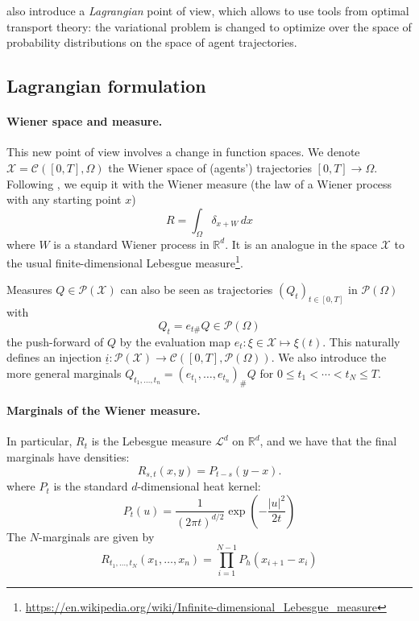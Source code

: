 \documentclass[11pt]{article}
\newcommand{\RR}{\mathbb{R}}
\newcommand{\calC}{\mathcal{C}}
\newcommand{\calP}{\mathcal{P}}
\newcommand{\calX}{\mathcal{X}}
\numberwithin{equation}{section}
\theoremstyle{definition}
\begin{document}
\textcite{benamou:hal-01295299,benamou2018entropy} also introduce a \textit{Lagrangian} point of view, which allows to use tools from optimal transport theory: the variational problem is changed to optimize over the space of probability distributions on the space of agent trajectories.


\subsection{Lagrangian formulation}

\paragraph{Wiener space and measure.} 
This new point of view involves a change in function spaces. We denote $\calX = \calC([0,T], \Omega)$ the Wiener space of (agents') trajectories $[0,T] \rightarrow\Omega$. Following \cites{benamou:hal-01295299,benamou2015lagrangian}, we equip it with the Wiener measure (the law of a Wiener process with any starting point $x$)
\[
   	R = \int_\Omega \delta_{x + W}\,dx
\]
where $W$ is a standard Wiener process in $\RR^d$. It is an analogue in the space $\calX$ to the usual finite-dimensional Lebesgue measure\footnote{\url{https://en.wikipedia.org/wiki/Infinite-dimensional_Lebesgue_measure}}.
  	
Measures $Q \in \calP(\calX)$ can also be seen as trajectories $(Q_t)_{t\in[0,T]}$ in $\calP(\Omega)$ with
\[
   	Q_t = e_{t\#}Q \in \calP(\Omega)
\]
the push-forward of $Q$ by the evaluation map $e_t\colon \xi\in\calX\longmapsto \xi(t)$. This naturally defines an injection $\underline{i} \colon \calP(\calX) \rightarrow \calC([0,T], \calP(\Omega))$. We also introduce the more general marginals $Q_{t_1,\ldots,t_n} = (e_{t_1},\ldots, e_{t_n})_\# Q$ for $0\leq t_1 < \cdots < t_N \leq T$.

\paragraph{Marginals of the Wiener measure.} In particular, $R_t$ is the Lebesgue measure $\mathcal{L}^d$ on $\RR^d$, and we have that the final marginals have densities:
\begin{equation}\label{eq:2MarginWienerMeasure}
   	R_{s,t}(x,y) = P_{t-s}(y-x).
\end{equation}
where $P_t$ is the standard $d$-dimensional heat kernel:
\begin{equation}
	P_t(u) =
	\frac{1}{(2\pi t)^{d/2}} \exp\left(-\frac{|u|^2}{2t}\right)
\end{equation}
The $N$-marginals are given by
\begin{equation}
	R_{t_1,\ldots,t_N}(x_1,\ldots,x_n) = 
	\prod_{i=1}^{N-1}
	P_{h}(x_{i+1}-x_i)
\end{equation}
\end{document}
